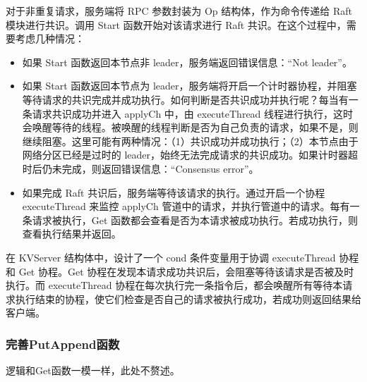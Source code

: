 \documentclass[]{article}
\begin{document}
	对于非重复请求，服务端将 RPC 参数封装为 Op 结构体，作为命令传递给 Raft 模块进行共识。调用 Start 函数开始对该请求进行 Raft 共识。在这个过程中，需要考虑几种情况：
	\begin{itemize}
		\item 如果 Start 函数返回本节点非 leader，服务端返回错误信息：“Not leader”。
	
		\item 如果 Start 函数返回本节点为 leader，服务端将开启一个计时器协程，并阻塞等待请求的共识完成并成功执行。如何判断是否共识成功并执行呢？每当有一条请求共识成功并进入 applyCh 中，由 executeThread 线程进行执行，这时会唤醒等待的线程。被唤醒的线程判断是否为自己负责的请求，如果不是，则继续阻塞。这里可能有两种情况：（1）共识成功并成功执行；（2）本节点由于网络分区已经是过时的 leader，始终无法完成请求的共识成功。如果计时器超时后仍未完成，则返回错误信息：“Consensus error”。
	
		\item 如果完成 Raft 共识后，服务端等待该请求的执行。通过开启一个协程 executeThread 来监控 applyCh 管道中的请求，并执行管道中的请求。每有一条请求被执行，Get 函数都会查看是否为本请求被成功执行。若成功执行，则查看执行结果并返回。
	\end{itemize}
	\par
	在 KVServer 结构体中，设计了一个 cond 条件变量用于协调 executeThread 协程和 Get 协程。Get 协程在发现本请求成功共识后，会阻塞等待该请求是否被及时执行。而 executeThread 协程在每次执行完一条指令后，都会唤醒所有等待本请求执行结束的协程，使它们检查是否自己的请求被执行成功，若成功则返回结果给客户端。
	
	\subsubsection{完善PutAppend函数}
	逻辑和Get函数一模一样，此处不赘述。
	
\end{document}
